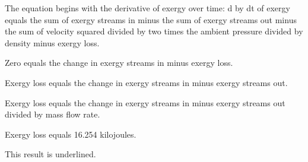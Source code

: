 The equation begins with the derivative of exergy over time:  
d by dt of exergy equals the sum of exergy streams in minus the sum of exergy streams out minus the sum of velocity squared divided by two times the ambient pressure divided by density minus exergy loss.  

Zero equals the change in exergy streams in minus exergy loss.  

Exergy loss equals the change in exergy streams in minus exergy streams out.  

Exergy loss equals the change in exergy streams in minus exergy streams out divided by mass flow rate.  

Exergy loss equals 16.254 kilojoules.  

This result is underlined.
